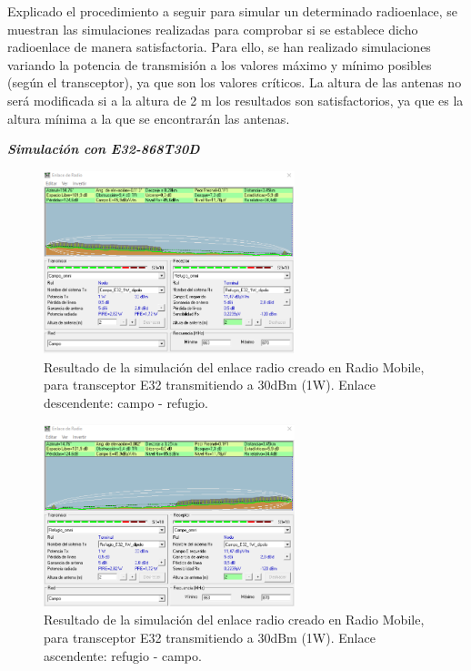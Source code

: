 \documentclass[12pt]{article}
\begin{document}
	\noindent Explicado el procedimiento a seguir para simular un determinado radioenlace, se muestran las simulaciones realizadas para comprobar si se establece dicho radioenlace de manera satisfactoria. Para ello, se han realizado simulaciones variando la potencia de transmisión a los valores máximo y mínimo posibles (según el transceptor), ya que son los valores críticos. La altura de las antenas no será modificada si a la altura de 2 m los resultados son satisfactorios, ya que es la altura mínima a la que se encontrarán las antenas. \\
	
	\pagebreak
	
	\noindent \textit{\textbf{Simulación con E32-868T30D}} \\
	
	\begin{figure}[h!]
		\begin{center}
			\includegraphics[width=0.65\textwidth]{img/resultado_e32_1W_desc.png}
			\caption{Resultado de la simulación del enlace radio creado en Radio Mobile, para transceptor E32 transmitiendo a 30dBm (1W). Enlace descendente: campo - refugio.}
			\label{fig: resultado enlace e32 1W descendente radio mobile}
		\end{center}
	\end{figure}

	
	\begin{figure}[h!]
			\begin{center}
				\includegraphics[width=0.65\textwidth]{img/resultado_e32_1W_asc.png}
				\caption{Resultado de la simulación del enlace radio creado en Radio Mobile, para transceptor E32 transmitiendo a 30dBm (1W). Enlace ascendente: refugio - campo.}
				\label{fig: resultado enlace e32 1W ascendente radio mobile}
			\end{center}
	\end{figure}
	
\end{document}

